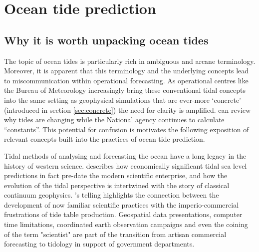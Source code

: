 \section{Ocean tide prediction}
\label{sec:tidesOverview}
\subsection{Why it is worth unpacking ocean tides}
\label{sec:semantics}
The topic of ocean tides is particularly rich in ambiguous and arcane terminology.  
Moreover, it is apparent that this terminology and the underlying concepts lead to miscommunication within operational forecasting.  As operational centres like the Bureau of Meteorology increasingly bring these conventional tidal concepts into the same setting as geophysical simulations that are ever-more `concrete' (introduced in section \ref{sec:concrete}) the need for clarity is amplified.  \citet{10.1146/annurev-marine-010419-010727} can review why tides are changing while the National agency continues to calculate ``constants''.  
This potential for confusion is motivates the following exposition of relevant concepts built into the practices of ocean tide prediction.

\newline{}


Tidal methods of analysing and forecasting the ocean have a long legacy in the history of western science.  \citet{reidy_tideshistory}
describes how economically significant tidal sea level predictions in fact pre-date the modern scientific enterprise, and how the evolution of the tidal perspective is intertwined with the story of classical continuum geophysics.   \citeauthor{reidy_tideshistory}'s telling highlights the connection between the development of now familiar scientific practices with the imperio-commercial frustrations of tide table production. Geospatial data presentations, computer time limitations, coordinated earth observation campaigns and even the coining of the term "scientist" are part of the transition from artisan commercial forecasting to tidology in support of government departments.   




